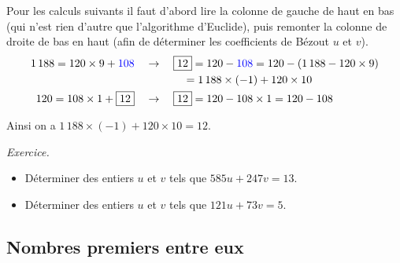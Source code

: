 \documentclass[11pt,class=report,crop=false]{standalone}
\newcommand{\pgcd}{\mathop{\mathrm{pgcd}}\nolimits}
\begin{document}
    \medskip
    
Pour les calculs suivants il faut d'abord lire la colonne de gauche de haut en bas (qui n'est rien d'autre que l'algorithme d'Euclide), puis remonter la colonne de droite de bas en haut (afin de déterminer les coefficients de Bézout $u$ et $v$).
\begin{equation*}
    \begin{aligned}
      1\,188 = 120 \times 9 + {\color{blue}108} & \quad \rightarrow \quad \boxed{12}=120-{\color{blue}108}=120-(1\,188-120\times9)\\
      & \qquad \quad \;\, \quad =1\,188\times(-1)+120\times10\\
      120 = 108 \times 1 + \boxed{12} & \quad \rightarrow \quad \boxed{12} = 120-108\times1=120-108\\
    \end{aligned}
\end{equation*}
 
Ainsi on a $1\,188 \times (-1) + 120 \times 10 = 12$.


\medskip

\emph{Exercice.}
\begin{itemize}
    \item Déterminer des entiers $u$ et $v$ tels que $585u+247v=13$.
    
    \item Déterminer des entiers $u$ et $v$ tels que $121 u + 73 v = 5$.
\end{itemize}



\subsection*{Nombres premiers entre eux}
\end{document}
